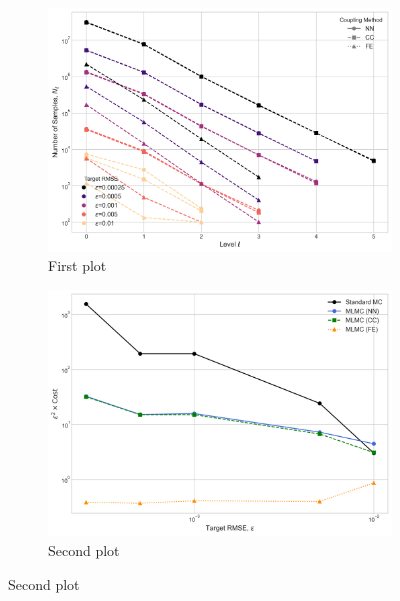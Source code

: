 \begin{figure}[htbp]
    \centering
    \begin{subfigure}{0.45\textwidth}
        \centering
        \includegraphics[width=\linewidth]{graphics/she_sq_amps_nums.png}
        \caption{First plot}
        \label{fig:plot1}
    \end{subfigure}
    \hfill
    \begin{subfigure}{0.45\textwidth}
        \centering
        \includegraphics[width=\linewidth]{graphics/she_sq_amp_costs.png}
        \caption{Second plot}
        \label{fig:plot2}
    \end{subfigure}
    

\end{figure}
